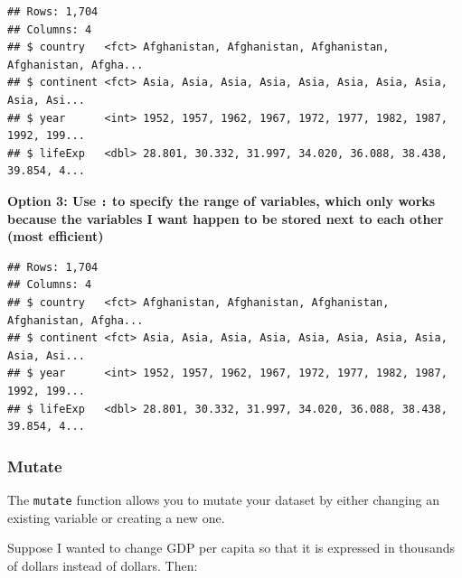 \documentclass[
]{book}
\newenvironment{Shaded}{\begin{snugshade}}{\end{snugshade}}
\newcommand{\DataTypeTok}[1]{\textcolor[rgb]{0.13,0.29,0.53}{#1}}
\newcommand{\DecValTok}[1]{\textcolor[rgb]{0.00,0.00,0.81}{#1}}
\newcommand{\KeywordTok}[1]{\textcolor[rgb]{0.13,0.29,0.53}{\textbf{#1}}}
\newcommand{\NormalTok}[1]{#1}
\newcommand{\OperatorTok}[1]{\textcolor[rgb]{0.81,0.36,0.00}{\textbf{#1}}}
\newcommand{\StringTok}[1]{\textcolor[rgb]{0.31,0.60,0.02}{#1}}
\begin{document}
\begin{verbatim}
## Rows: 1,704
## Columns: 4
## $ country   <fct> Afghanistan, Afghanistan, Afghanistan, Afghanistan, Afgha...
## $ continent <fct> Asia, Asia, Asia, Asia, Asia, Asia, Asia, Asia, Asia, Asi...
## $ year      <int> 1952, 1957, 1962, 1967, 1972, 1977, 1982, 1987, 1992, 199...
## $ lifeExp   <dbl> 28.801, 30.332, 31.997, 34.020, 36.088, 38.438, 39.854, 4...
\end{verbatim}

\textbf{Option 3: Use \texttt{:} to specify the range of variables, which only works because the variables I want happen to be stored next to each other (most efficient)}

\begin{Shaded}
\end{Shaded}

\begin{verbatim}
## Rows: 1,704
## Columns: 4
## $ country   <fct> Afghanistan, Afghanistan, Afghanistan, Afghanistan, Afgha...
## $ continent <fct> Asia, Asia, Asia, Asia, Asia, Asia, Asia, Asia, Asia, Asi...
## $ year      <int> 1952, 1957, 1962, 1967, 1972, 1977, 1982, 1987, 1992, 199...
## $ lifeExp   <dbl> 28.801, 30.332, 31.997, 34.020, 36.088, 38.438, 39.854, 4...
\end{verbatim}

\hypertarget{mutate}{%
\subsubsection*{Mutate}\label{mutate}}

The \texttt{mutate} function allows you to mutate your dataset by either changing an existing variable or creating a new one.

Suppose I wanted to change GDP per capita so that it is expressed in thousands of dollars instead of dollars. Then:

\begin{Shaded}
\end{Shaded}
\end{document}
